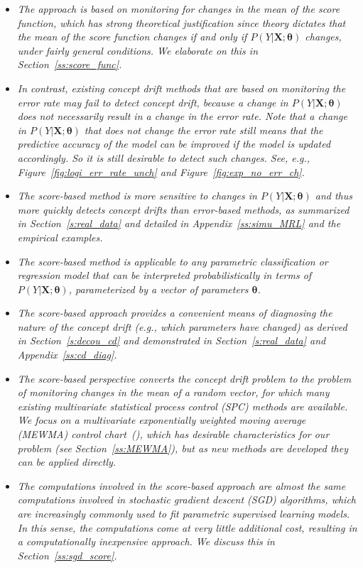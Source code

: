 \documentclass[twoside,11pt]{article}
\begin{document}
\begin{itemize}
\item
\textit{The approach is based on monitoring for changes in the mean of the score function, which has strong theoretical justification since theory dictates that the mean of the score function changes if and only if $P(Y|\bm{X};\bm{\theta})$ changes, under fairly general conditions. We elaborate on this in Section~\ref{ss:score_func}.}
\item
\textit{In contrast, existing concept drift methods that are based on monitoring the error rate may fail to detect concept drift, because a change in $P(Y|\bm{X};\bm{\theta})$ does not necessarily result in a change in the error rate. Note that a change in $P(Y|\bm{X};\bm{\theta})$ that does not change the error rate still means that the predictive accuracy of the model can be improved if the model is updated accordingly. So it is still desirable to detect such changes. See, e.g., Figure~\ref{fig:logi_err_rate_unch} and Figure~\ref{fig:exp_no_err_ch}.}
\item
\textit{The score-based method is more sensitive to changes in $P(Y|\bm{X}; \bm{\theta})$ and thus more quickly detects concept drifts than error-based methods, as summarized in Section~\ref{s:real_data} and detailed in Appendix~\ref{ss:simu_MRL} and the empirical examples.}
\item
\textit{The score-based method is applicable to any parametric classification or regression model that can be interpreted probabilistically in terms of $P(Y|\bm{X};\bm{\theta})$, parameterized by a vector of parameters $\bm{\theta}$.}
\item
\textit{The score-based approach provides a convenient means of diagnosing the nature of the concept drift (e.g., which parameters have changed) as derived in Section~\ref{s:decou_cd} and demonstrated in Section~\ref{s:real_data} and Appendix~\ref{ss:cd_diag}.}
\item
\textit{The score-based perspective converts the concept drift problem to the problem of monitoring changes in the mean of a random vector, for which many existing multivariate statistical process control (SPC) methods are available. We focus on a multivariate exponentially weighted moving average (MEWMA) control chart~(\cite{montgomery2007introduction}), which has desirable characteristics for our problem (see Section~\ref{ss:MEWMA}), but as new methods are developed they can be applied directly.}
\item
\textit{The computations involved in the score-based approach are almost the same computations involved in stochastic gradient descent (SGD) algorithms, which are increasingly commonly used to fit parametric supervised learning models. In this sense, the computations come at very little additional cost, resulting in a computationally inexpensive approach. We discuss this in Section~\ref{ss:sgd_score}.}

\end{itemize}
\end{document}
